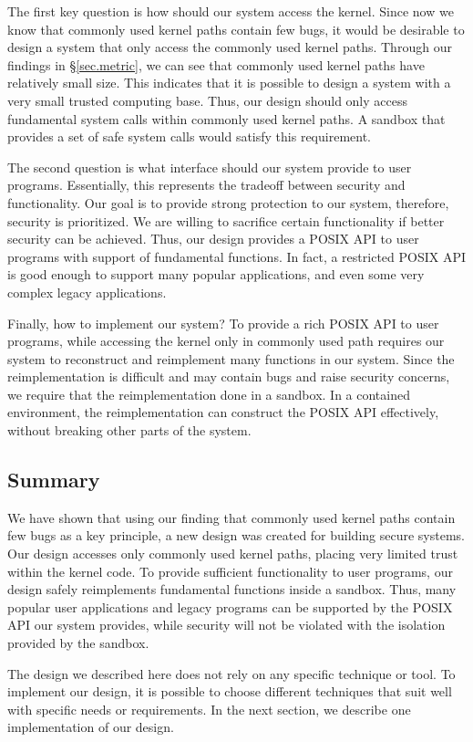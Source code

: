 The first key question is how should our system access the kernel. Since now we know 
that commonly used kernel paths contain few bugs, it would be desirable to design a system that only access the 
commonly used kernel paths. Through our findings in \S{\ref{sec.metric}}, we can see that commonly used kernel paths have relatively 
small size. This indicates that it is possible to design a system with a very small 
trusted computing base. Thus, our design should only access fundamental system 
calls within commonly used kernel paths. A sandbox that provides a 
set of safe system calls would satisfy this requirement.

The second question is what interface should our system provide to user programs. 
Essentially, this represents the tradeoff between 
security and functionality. Our goal is to provide strong protection to our system, therefore, security is prioritized. We are willing 
to sacrifice certain functionality if better security can be achieved. Thus, our design provides a POSIX API to user programs with 
support of fundamental functions. In fact, a restricted POSIX API is good enough to support many popular applications, 
and even some very complex legacy applications. 

Finally, how to implement our system? 
To provide a rich POSIX API to user programs, while accessing the kernel only in commonly used path requires our system to 
reconstruct and reimplement many functions in our system. Since the reimplementation is difficult and may contain bugs 
and raise security concerns, we require that the reimplementation done in a sandbox. In a contained 
environment, the reimplementation can construct the POSIX API effectively, without breaking other parts of the system.  

\subsection{Summary}
We have shown that using our finding that commonly used kernel paths contain few bugs as a key principle, a new design was created 
for building secure systems. Our design accesses only commonly used kernel paths, placing very limited trust within the kernel code. 
To provide sufficient functionality to user programs, our design safely reimplements fundamental functions inside a sandbox. Thus, many 
popular user applications and legacy programs can be supported by the POSIX API our system provides, while security will not be violated 
with the isolation provided by the sandbox. 

The design we described here does not rely on any specific technique or tool. To implement our design, it is possible to choose different techniques 
that suit well with specific needs or requirements. In the next section, we describe one implementation of our design. 
